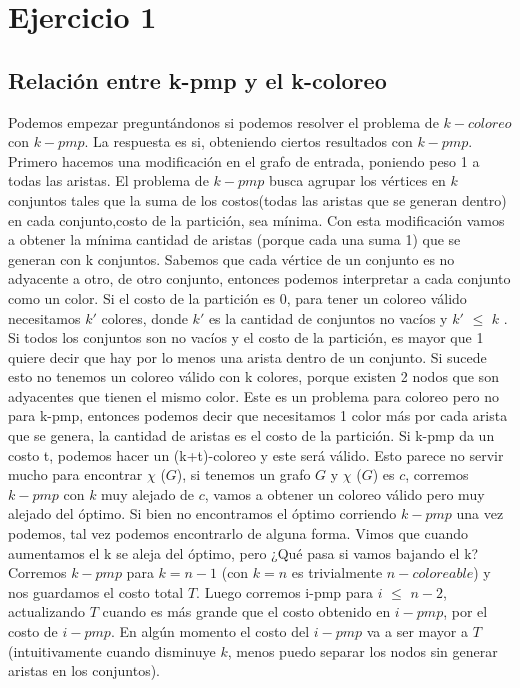 \documentclass[a4paper]{article}
\begin{document}
\section{Ejercicio 1}
\subsection{Relación entre k-pmp y el k-coloreo}
Podemos empezar preguntándonos si podemos resolver el problema de $k-coloreo$ con $k-pmp$. La respuesta es si, obteniendo ciertos resultados con $k-pmp$.\newline
Primero hacemos una modificación en el grafo de entrada, poniendo peso 1 a todas las aristas. El problema de   $k-pmp$ busca agrupar los vértices en $k$ conjuntos tales que la suma de los costos(todas las aristas que se generan dentro) en cada conjunto,costo de la partición, sea mínima. Con esta modificación vamos a obtener la mínima cantidad de aristas (porque cada una suma 1) que se generan con k conjuntos.\newline
Sabemos que cada vértice de un conjunto es no adyacente a otro, de otro conjunto, entonces podemos interpretar a cada conjunto como un color. Si el costo de la partición es 0, para tener un coloreo válido necesitamos $k'$ colores, donde $k'$ es la cantidad de conjuntos no vacíos y $k'$ $\leq$ $k$ . \newline
Si todos los conjuntos son no vacíos y el costo de la partición, es mayor que 1 quiere decir que hay por lo menos una arista dentro de un conjunto. Si sucede esto no tenemos un coloreo válido con k colores, porque existen 2 nodos que son adyacentes que tienen el mismo color.
Este es un problema para coloreo pero no para k-pmp, entonces podemos decir que necesitamos 1 color más por cada arista que se genera, la cantidad de aristas es el costo de la partición. Si k-pmp da un costo t, podemos hacer un (k+t)-coloreo y este será válido. \newline
Esto parece no servir mucho para encontrar $\chi$ ($G$), si tenemos un grafo $G$ y $\chi$ ($G$) es $c$, corremos $k-pmp$ con $k$ muy alejado de $c$, vamos a obtener un coloreo válido pero muy alejado del óptimo.\newline
Si bien no encontramos el óptimo corriendo $k-pmp$ una vez podemos, tal vez podemos encontrarlo de alguna forma. Vimos que cuando aumentamos el k se aleja del óptimo, pero ¿Qué pasa si vamos bajando el k? \newline
Corremos $k-pmp$ para $k=n-1$ (con $k=n$ es trivialmente $n-coloreable$) y nos guardamos el costo total $T$. Luego corremos i-pmp para $i$ $\leq$ $n-2$, actualizando $T$ cuando es más grande que el costo obtenido en $i-pmp$, por el costo de $i-pmp$. En algún momento el costo del $i-pmp$ va a ser mayor a $T$ (intuitivamente cuando disminuye $k$, menos puedo separar los nodos sin generar aristas en los conjuntos). \newline %
\end{document}
